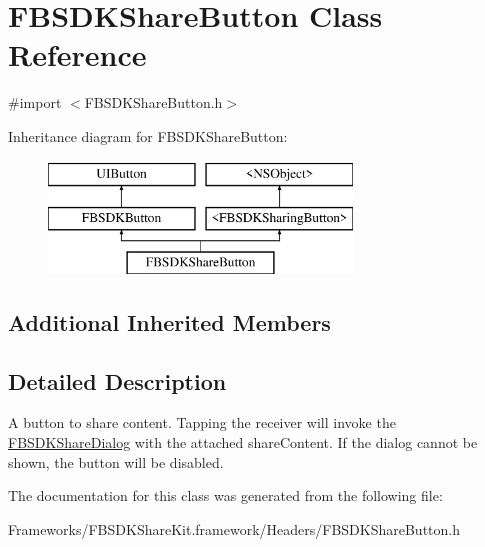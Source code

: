 \hypertarget{interface_f_b_s_d_k_share_button}{}\section{F\+B\+S\+D\+K\+Share\+Button Class Reference}
\label{interface_f_b_s_d_k_share_button}


{\ttfamily \#import $<$F\+B\+S\+D\+K\+Share\+Button.\+h$>$}

Inheritance diagram for F\+B\+S\+D\+K\+Share\+Button\+:\begin{figure}[H]
\begin{center}
\leavevmode
\includegraphics[height=3.000000cm]{interface_f_b_s_d_k_share_button}
\end{center}
\end{figure}
\subsection*{Additional Inherited Members}


\subsection{Detailed Description}
A button to share content.  Tapping the receiver will invoke the \hyperlink{interface_f_b_s_d_k_share_dialog}{F\+B\+S\+D\+K\+Share\+Dialog} with the attached share\+Content. If the dialog cannot be shown, the button will be disabled. 

The documentation for this class was generated from the following file\+:\begin{DoxyCompactItemize}
\item 
Frameworks/\+F\+B\+S\+D\+K\+Share\+Kit.\+framework/\+Headers/F\+B\+S\+D\+K\+Share\+Button.\+h\end{DoxyCompactItemize}
